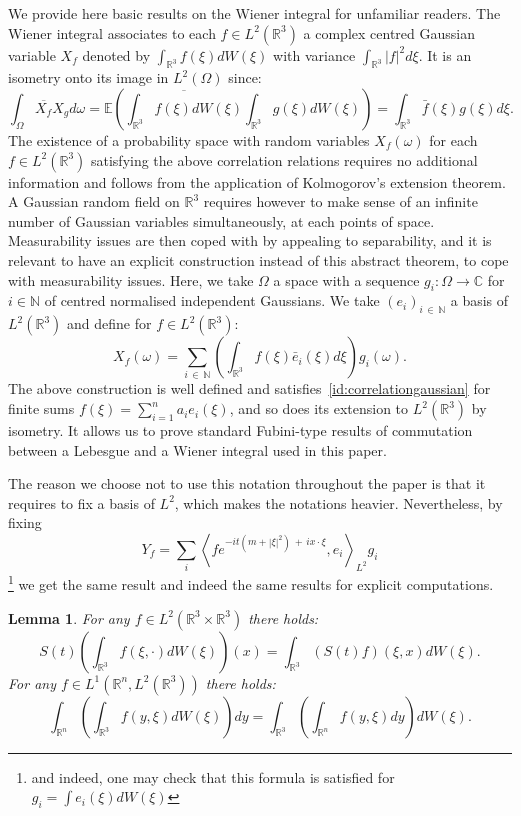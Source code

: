 \documentclass[10pt]{amsart}
\newtheorem{lemm}[theo]{Lemma}\newtheorem{prop}[theo]{Proposition}\newtheorem{coro}[theo]{Corollary}\newtheorem{conj}[theo]{Conjecture}
\theoremstyle{definition}\newtheorem{defi}[theo]{Definition}\newtheorem{rema}[theo]{Remark}\newtheorem{exam}[theo]{Example}\newtheorem{exem}[theo]{Example}\newtheorem{nota}[theo]{Notation}
\newcommand{\R}{\mathbb{R}}
\newcommand{\C}{\mathbb{C}}
\newcommand{\N}{\mathbb{N}}
\newcommand{\E}{\mathbb{E}}
\begin{document}
We provide here basic results on the Wiener integral for unfamiliar readers. The Wiener integral associates to each $f\in L^2(\R^3)$ a complex centred Gaussian variable $X_f$ denoted by $\int_{\R^3} f(\xi) dW(\xi) $ with variance $\int_{\R^3} |f|^2d\xi$. It is an isometry onto its image in $L^2(\Omega)$ since:
\begin{equation} \label{id:correlationgaussian}
\int_\Omega \overline{X_f}X_g d\omega=\E \left(\overline{\int_{\R^3} f(\xi)dW(\xi)} \int_{\R^3} g(\xi)dW(\xi) \right)=\int_{\R^3} \bar f(\xi)g(\xi)d\xi.
\end{equation}
The existence of a probability space with random variables $X_f(\omega)$ for each $f\in L^2(\R^3)$ satisfying the above correlation relations requires no additional information and follows from the application of Kolmogorov's extension theorem. A Gaussian random field on $\R^3$ requires however to make sense of an infinite number of Gaussian variables simultaneously, at each points of space. Measurability issues are then coped with by appealing to separability, and it is relevant to have an explicit construction instead of this abstract theorem, to cope with measurability issues. Here, we take $\Omega$ a space with a sequence $g_i:\Omega \rightarrow \C$ for $i\in \N$ of centred normalised independent Gaussians. We take $(e_i)_{i\,\in\,\N}$ a basis of $L^2(\R^3)$ and define for $f\in L^2(\R^3)$:
\begin{equation} \label{id:explicitwhitenoise}
X_f(\omega)=\sum_{i\,\in\,\N} \left(\int_{\R^3} f (\xi)\bar e_i(\xi)d\xi\right)g_i(\omega).
\end{equation}
The above construction is well defined and satisfies~\eqref{id:correlationgaussian} for finite sums $f(\xi)=\sum_{i=1}^n a_ie_i(\xi)$, and so does its extension to $L^2(\R^3)$ by isometry. It allows us to prove standard Fubini-type results of commutation between a Lebesgue and a Wiener integral used in this paper.

The reason we choose not to use this notation throughout the paper is that it requires to fix a basis of $L^2$, which makes the notations heavier. Nevertheless, by fixing
\[
Y_f = \sum_i \left\langle fe^{-it\left(m+|\xi|^2\right)\,+ \,ix\cdot \xi}, e_i\right\rangle_{L^2} g_i
\]
\footnote{and indeed, one may check that this formula is satisfied for $g_i = \int e_i(\xi)dW(\xi)$}
we get the same result and indeed the same results for explicit computations.

\begin{lemm}
For any $f\in L^2(\R^3\times \R^3)$ there holds:
\begin{equation} \label{id:fubinischrodingerwiener}
S(t) \left(\int_{\R^3} f(\xi,\cdot)dW(\xi) \right)(x)= \int_{\R^3} (S(t) f)(\xi,x)dW(\xi).
\end{equation}
For any $f\in L^1(\R^n,L^2 (\R^3))$ there holds:
\begin{equation} \label{id:fubinilebesguewiener}
\int_{\R^n} \left(\int_{\R^3} f(y,\xi)dW(\xi)\right)dy=\int_{\R^3} \left(\int_{\R^n} f(y,\xi)dy \right)dW(\xi).
\end{equation}
\end{lemm}
\end{document}
